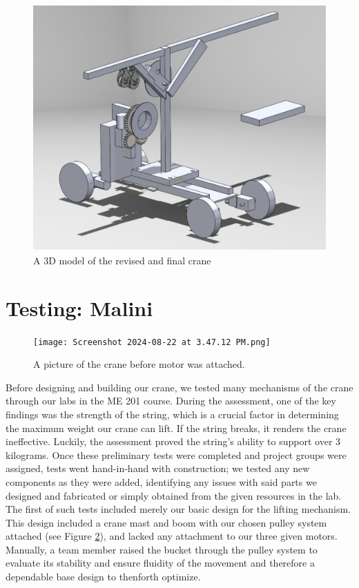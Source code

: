 \documentclass[letterpaper, 12pt]{article}
\begin{document}
\begin{figure}[H]
    \centering
    \caption{A 3D model of the revised and final crane}
    \label{fig: Crane_render_2}
    \includegraphics{Crane Render 2.png}
\end{figure}

\section{Testing: Malini}
\begin{figure}[H]
    \centering
    \texttt{[image: Screenshot 2024-08-22 at 3.47.12 PM.png]}
    \caption{A picture of the crane before motor was attached.}
    \label{fig:pic of Crane}
\end{figure}

Before designing and building our crane, we tested many mechanisms of the crane through our labs in the ME 201 course. 
During the assessment, one of the key findings was the strength of the string, which is a crucial factor in determining the maximum weight our crane can lift. 
If the string breaks, it renders the crane ineffective.
Luckily, the assessment proved the string’s ability to support over 3 kilograms.
Once these preliminary tests were completed and project groups were assigned, tests went hand-in-hand with construction; we tested any new components as they were added, identifying any issues with said parts we designed and fabricated or simply obtained from the given resources in the lab. 
The first of such tests included merely our basic design for the lifting mechanism. 
This design included a crane mast and boom with our chosen pulley system attached (see Figure \ref{fig:pic of Crane}), and lacked any attachment to our three given motors. 
Manually, a team member raised the bucket through the pulley system to evaluate its stability and ensure fluidity of the movement and therefore a dependable base design to thenforth optimize. 
\end{document}

